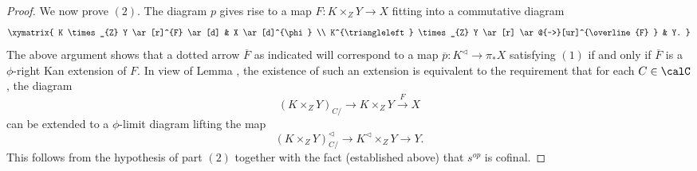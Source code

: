 \begin{proof}
We now prove $(2)$. The diagram $p$ gives rise to a map $F: K \times_{Z} Y \rightarrow X$ fitting into a commutative diagram
$$ \xymatrix{ K \times_{Z} Y \ar[r]^{F} \ar[d] & X \ar[d]^{\phi} \\
K^{\triangleleft} \times_{Z} Y \ar[r] \ar@{-->}[ur]^{\overline{F} } & Y. }$$
The above argument shows that a dotted arrow $\overline{F}$ as indicated will correspond to a map $\overline{p}: K^{\triangleleft} \rightarrow \pi_{\ast} X$ satisfying $(1)$ if and only if
$\overline{F}$ is a $\phi$-right Kan extension of $F$. In view of Lemma , the
existence of such an extension is equivalent to the requirement that for each $C \in \calC$, 
the diagram 
$$ (K \times_{Z} Y)_{C/} \rightarrow K \times_{Z} Y
\stackrel{F}{\rightarrow} X$$
can be extended to a $\phi$-limit diagram lifting the map
$$ (K \times_{Z} Y)^{\triangleleft}_{C/} \rightarrow K^{\triangleleft} \times_{Z} Y
\rightarrow Y.$$
This follows from the hypothesis of part $(2)$ together with the fact (established above) that
$s^{op}$ is cofinal.
\end{proof}

